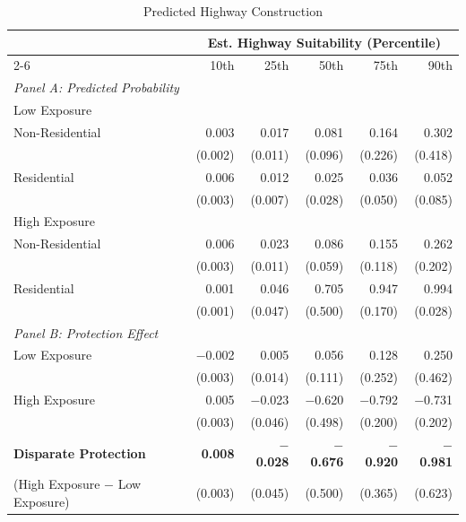 \begin{table}[h]
\centering
\caption{Predicted Highway Construction }
\label{tab:slides/predicted_outcomes/black_share_interaction_sweep}
\begin{threeparttable}
\begin{tabular*}{1\textwidth}{@{\extracolsep{\fill}}lr@{\hspace{1.2em}}r@{\hspace{1.2em}}r@{\hspace{1.2em}}r@{\hspace{1.2em}}r@{\hspace{1.2em}}}
\toprule
 & \multicolumn{5}{c}{Est. Highway Suitability (Percentile)} \\
\cmidrule(l){2-6}
 & 10th & 25th & 50th & 75th & 90th \\
\midrule
\textit{Panel A: Predicted Probability} & & & & & \\
\addlinespace[2pt]
Low Exposure & & & & & \\
\quad Non-Residential & 0.003 & 0.017 & 0.081 & 0.164 & 0.302 \\
 & (0.002) & (0.011) & (0.096) & (0.226) & (0.418) \\[4pt]
\quad Residential & 0.006 & 0.012 & 0.025 & 0.036 & 0.052 \\
 & (0.003) & (0.007) & (0.028) & (0.050) & (0.085) \\[4pt]
High Exposure & & & & & \\
\quad Non-Residential & 0.006 & 0.023 & 0.086 & 0.155 & 0.262 \\
 & (0.003) & (0.011) & (0.059) & (0.118) & (0.202) \\[4pt]
\quad Residential & 0.001 & 0.046 & 0.705 & 0.947 & 0.994 \\
 & (0.001) & (0.047) & (0.500) & (0.170) & (0.028) \\[4pt]
\midrule
\textit{Panel B: Protection Effect} & & & & & \\
\addlinespace[2pt]
Low Exposure & $-$0.002 & 0.005 & 0.056 & 0.128 & 0.250 \\
 & (0.003) & (0.014) & (0.111) & (0.252) & (0.462) \\[4pt]
High Exposure & 0.005\rlap{$^{**}$} & $-$0.023 & $-$0.620 & $-$0.792\rlap{$^{***}$} & $-$0.731\rlap{$^{***}$} \\
 & (0.003) & (0.046) & (0.498) & (0.200) & (0.202) \\[4pt]
\addlinespace[2pt]
\textbf{Disparate Protection} & \textbf{0.008}\rlap{$^{***}$} & \textbf{$-$0.028} & \textbf{$-$0.676} & \textbf{$-$0.920}\rlap{$^{**}$} & \textbf{$-$0.981} \\
(High Exposure $-$ Low Exposure) & (0.003) & (0.045) & (0.500) & (0.365) & (0.623) \\
\bottomrule
\end{tabular*}
\end{threeparttable}
\end{table}
